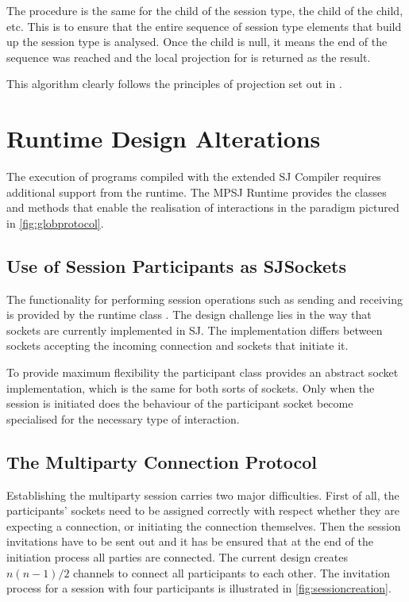 The procedure is the same for the child of the session type, the child of the child, etc. This is to ensure that the entire sequence of session type elements that build up the session type is analysed. Once the child is null, it means the end of the sequence was reached and the local projection for  is returned as the result.

This algorithm clearly follows the principles of projection set out in \cite{multiparty_sess_types}.  


\section{Runtime Design Alterations}

The execution of programs compiled with the extended SJ Compiler requires additional support from the runtime. The MPSJ Runtime provides the classes and methods that enable the realisation of interactions in the paradigm pictured in \autoref{fig:globprotocol}.

\subsection{Use of Session Participants as SJSockets}

The functionality for performing session operations such as sending and receiving is provided by the runtime class . The design challenge lies in the way that sockets are currently implemented in SJ. The implementation differs between sockets accepting the incoming connection and sockets that initiate it.

To provide maximum flexibility the participant class provides an abstract socket implementation, which is the same for both sorts of sockets. Only when the session is initiated does the behaviour of the participant socket become specialised for the necessary type of interaction. 

\subsection{The Multiparty Connection Protocol}

Establishing the multiparty session carries two major difficulties. First of all, the participants' sockets need to be assigned correctly with respect whether they are expecting a connection, or initiating the connection themselves. Then the session invitations have to be sent out and it has be ensured that at the end of the initiation process all parties are connected. The current design creates $n (n-1) /2 $ channels to connect all participants to each other. The invitation process for a session with four participants is illustrated in \autoref{fig:sessioncreation}.  


